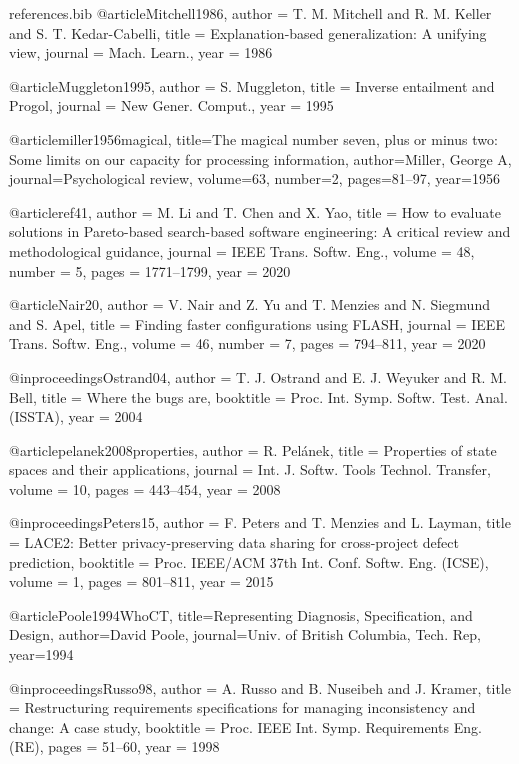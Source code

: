 \documentclass[pdflatex,sn-basic]{sn-jnl}
\begin{document}
\begin{filecontents}{references.bib}
@article{Mitchell1986,
  author  = {T. M. Mitchell and R. M. Keller and S. T. Kedar-Cabelli},
  title   = {Explanation-based generalization: A unifying view},
  journal = {Mach. Learn.},
  year    = {1986}
}

@article{Muggleton1995,
  author  = {S. Muggleton},
  title   = {Inverse entailment and Progol},
  journal = {New Gener. Comput.},
  year    = {1995}
}

@article{miller1956magical,
  title={The magical number seven, plus or minus two: Some limits on our capacity for processing information},
  author={Miller, George A},
  journal={Psychological review},
  volume={63},
  number={2},
  pages={81--97},
  year={1956}
}

@article{ref41,
  author  = {M. Li and T. Chen and X. Yao},
  title   = {How to evaluate solutions in Pareto-based search-based software engineering: A critical review and methodological guidance},
  journal = {IEEE Trans. Softw. Eng.},
  volume  = {48},
  number  = {5},
  pages   = {1771--1799},
  year    = {2020}
}


@article{Nair20,
  author  = {V. Nair and Z. Yu and T. Menzies and N. Siegmund and S. Apel},
  title   = {Finding faster configurations using FLASH},
  journal = {IEEE Trans. Softw. Eng.},
  volume  = {46},
  number  = {7},
  pages   = {794--811},
  year    = {2020}
}

@inproceedings{Ostrand04,
  author    = {T. J. Ostrand and E. J. Weyuker and R. M. Bell},
  title     = {Where the bugs are},
  booktitle = {Proc. Int. Symp. Softw. Test. Anal. (ISSTA)},
  year      = {2004}
}

@article{pelanek2008properties,
  author  = {R. Pel{\'a}nek},
  title   = {Properties of state spaces and their applications},
  journal = {Int. J. Softw. Tools Technol. Transfer},
  volume  = {10},
  pages   = {443--454},
  year    = {2008}
}

@inproceedings{Peters15,
  author    = {F. Peters and T. Menzies and L. Layman},
  title     = {LACE2: Better privacy-preserving data sharing for cross-project defect prediction},
  booktitle = {Proc. IEEE/ACM 37th Int. Conf. Softw. Eng. (ICSE)},
  volume    = {1},
  pages     = {801--811},
  year      = {2015}
}

@article{Poole1994WhoCT,
  title={Representing Diagnosis, Specification, and Design},
  author={David Poole}, journal={Univ. of British Columbia, Tech. Rep}, year={1994}
}

@inproceedings{Russo98,
  author    = {A. Russo and B. Nuseibeh and J. Kramer},
  title     = {Restructuring requirements specifications for managing inconsistency and change: A case study},
  booktitle = {Proc. IEEE Int. Symp. Requirements Eng. (RE)},
  pages     = {51--60},
  year      = {1998}
}


\end{filecontents}
\end{document}
